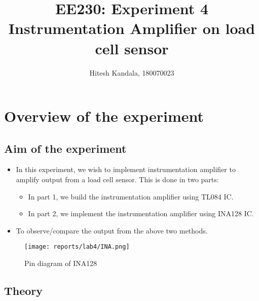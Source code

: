 \documentclass[12pt]{article}
\title{EE230: Experiment 4\\
Instrumentation Amplifier on load cell sensor}
\author{Hitesh Kandala, 180070023}
\begin{document}
\maketitle

\section{Overview of the experiment}

    \subsection{Aim of the experiment}
        \begin{itemize}
            \item In this experiment, we wish to implement instrumentation amplifier to amplify output from a load cell sensor. This is done in two parts:
            \begin{itemize}
                \item In part 1, we build the instrumentation amplifier using TL084 IC.
                \item In part 2, we implement the instrumentation amplifier using INA128 IC.
            \end{itemize}
            \item To observe/compare the output from the above two methods.
        \end{itemize}
        \begin{figure}[H]
            \centering
            \texttt{[image: reports/lab4/INA.png]}
            \caption{Pin diagram of INA128}
        \end{figure}

    \subsection{Theory}
\end{document}
